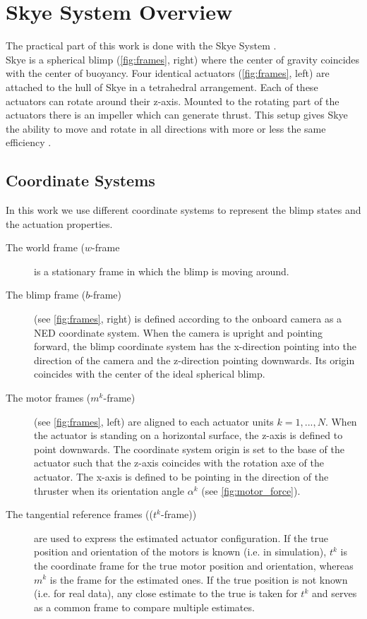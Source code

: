 \section{Skye System Overview}
The practical part of this work is done with the Skye System \citep{Skye2013}.\\
Skye is a spherical blimp (\cref{fig:frames}, right) where the center of gravity coincides with the center of buoyancy.
Four identical actuators (\cref{fig:frames}, left) are attached to the hull of Skye in a tetrahedral arrangement.
Each of these actuators can rotate around their z-axis.
Mounted to the rotating part of the actuators there is an impeller which can generate thrust.
This setup gives Skye the ability to move and rotate in all directions with more or less the same efficiency \citep[see][chap. 3]{Schaffner2012}.

\subsection{Coordinate Systems}
\label{sub:coordinate_systems}
In this work we use different coordinate systems to represent the blimp states and the actuation properties.
\begin{description}
\item[The world frame ($w$-frame] is a stationary frame in which the blimp is moving around.
\item[The blimp frame ($b$-frame)] (see \cref{fig:frames}, right) is defined according to the onboard camera as a NED coordinate system. 
When the camera is upright and pointing forward, the blimp coordinate system has the x-direction pointing into the direction of the camera and the z-direction pointing downwards.
Its origin coincides with the center of the ideal spherical blimp.
\item[The motor frames ($m^k$-frame)] (see \cref{fig:frames}, left) are aligned to each actuator units $k=1,...,N$.
When the actuator is standing on a horizontal surface, the z-axis is defined to point downwards.
The coordinate system origin is set to the base of the actuator such that the z-axis coincides with the rotation axe of the actuator.
The x-axis is defined to be pointing in the direction of the thruster when its orientation angle $\alpha^k$ (see \cref{fig:motor_force}).
\item[The tangential reference frames (($t^k$-frame))] are used to express the estimated actuator configuration.
If the true position and orientation of the motors is known (i.e. in simulation), $t^k$ is the coordinate frame for the true motor position and orientation, whereas $m^k$ is the frame for the estimated ones.
If the true position is not known (i.e. for real data), any close estimate to the true is taken for $t^k$ and serves as a common frame to compare multiple estimates.
\end{description}

